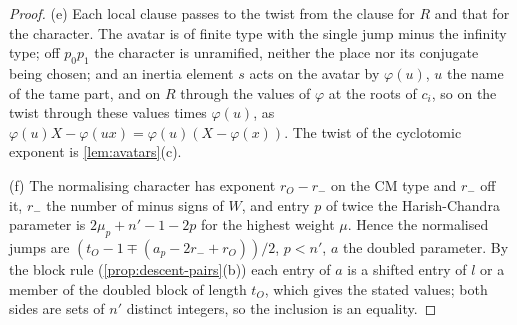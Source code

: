 \begin{proof}
(e) Each local clause passes to the twist from the clause for $R$ and that for the character. The avatar is of finite type with the single jump minus the infinity type; off $p_0p_1$ the character is unramified,
neither the place nor its conjugate being chosen; and an inertia element $s$ acts on the avatar by $\varphi(u)$, $u$ the name of the tame part, and on $R$ through the values of $\varphi$ at the roots of $c_i$, so on the twist
through these values times $\varphi(u)$, as $\varphi(u)X-\varphi(ux)=\varphi(u)(X-\varphi(x))$. The twist of the cyclotomic exponent is \cref{lem:avatars}(c).

(f) The normalising character has exponent $r_O-r_-$ on the CM type and $r_-$ off it, $r_-$ the number of minus signs of $W$, and entry $p$ of twice the Harish-Chandra parameter is $2\mu_p+n'-1-2p$ for the highest weight
$\mu$. Hence the normalised jumps are $(t_O-1\mp(a_p-2r_-+r_O))/2$, $p<n'$, $a$ the doubled parameter. By the block rule (\cref{prop:descent-pairs}(b)) each entry of $a$ is a shifted entry of $l$ or a member of the doubled block of
length $t_O$, which gives the stated values; both sides are sets of $n'$ distinct integers, so the inclusion is an equality.
\end{proof}


